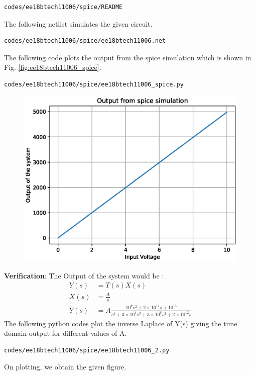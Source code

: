 \begin{enumerate}[label=\arabic*.,ref=\theenumi]
\begin{lstlisting}
codes/ee18btech11006/spice/README
\end{lstlisting}
The following netlist simulates the given circuit.
\begin{lstlisting}
codes/ee18btech11006/spice/ee18btech11006.net
\end{lstlisting}
The following code plots the output from the spice simulation which is shown in Fig. \ref{fig:ee18btech11006_spice}.
\begin{lstlisting}
codes/ee18btech11006/spice/ee18btech11006_spice.py
\end{lstlisting}
\renewcommand{\thefigure}{\theenumi.\arabic{figure}}
%
\begin{figure}[!ht]
\centering
\includegraphics[width=\columnwidth]{./figs/ee18btech11006/ee18btech11006_8.eps}
\caption{}
\label{fig:ee18btech11006_8}
\end{figure}
\textbf{Verification}: The Output of the system would be :
\begin{align}
    Y(s)&=T(s)X(s)\\
    X(s)&=\frac{A}{s}\\
    Y(s)&=A\frac{10^7s^2+2\times10^{11}s+10^{15}}{s^4+3\times10^4s^3+3\times10^8s^2+2\times10^{12}s}
\end{align}
The following python codes plot the inverse Laplace of Y(s) giving the time domain output for different values of A.
\begin{lstlisting}
codes/ee18btech11006/spice/ee18btech11006_2.py
\end{lstlisting}
On plotting, we obtain the given figure.\\

\end{enumerate}
